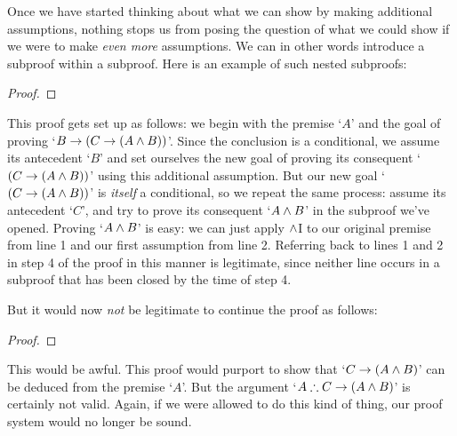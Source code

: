 
Once we have started thinking about what we can show by making additional assumptions, nothing stops us from posing the question of what we could show if we were to make \emph{even more} assumptions. We can in other words introduce a subproof within a subproof. Here is an example of such nested subproofs:
\begin{proof}
  
\open
	  
	\open
		  
	\close
\close
{}
\end{proof}
This proof gets set up as follows: we begin with the premise `$A$' and the goal of proving `$B \rightarrow (C \rightarrow (A \wedge B))$'.  Since the conclusion is a conditional, we assume its antecedent `$B$' and set ourselves the new goal of proving its consequent `$(C \rightarrow (A \wedge B))$' using this additional assumption.  But our new goal `$(C \rightarrow (A \wedge B))$' is \emph{itself} a conditional, so we repeat the same process: assume its antecedent `$C$', and try to prove its consequent `$A \wedge B$' in the subproof we've opened.  Proving `$A \wedge B$' is easy: we can just apply $\wedge $I to our original premise from line 1 and our first assumption from line 2.  Referring back to lines 1 and 2 in step 4 of the proof in this manner is legitimate,  since neither line occurs in a subproof that has been closed by the time of step 4.

But it would now \emph{not} be legitimate to continue the proof as follows:
\begin{proof}
\open
	\open
	\close
\close
{}
\end{proof}
This would be awful. This proof would purport to show that `$C \rightarrow (A \wedge B)$' can be deduced from the premise `$A$'.  But the argument  `$A \therefore C \rightarrow (A \wedge B)$' is certainly not valid. Again, if we were allowed to do this kind of thing, our proof system would no longer be sound.

